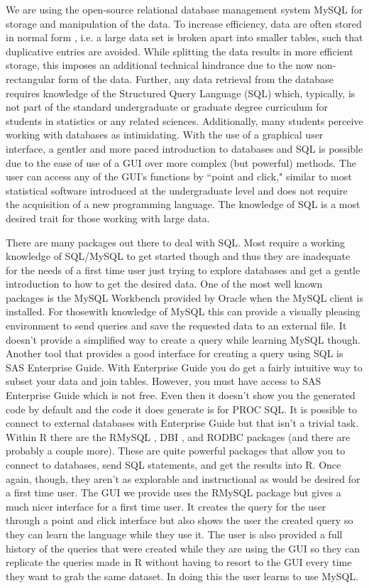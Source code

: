 \documentclass[11pt]{tise_style}
\begin{document}
We are using the open-source relational database management system MySQL \citep{mysql} for %
storage and manipulation of the data. To increase efficiency, data are often stored in normal form \citep{normalform:1983}, i.e. a large data set is broken apart into smaller  tables, such that duplicative entries are avoided. While splitting the data results in  more efficient storage, this imposes an additional technical hindrance due to the now non-rectangular form of the data. Further, any data retrieval from the database requires knowledge of the Structured Query Language (SQL) which, typically, is not part of the standard undergraduate or graduate degree curriculum for students in statistics or any related sciences. Additionally,  many students perceive working with databases as intimidating. With the use of a graphical user interface, a gentler and more paced introduction to databases and SQL is possible due to the ease of use of a GUI over more complex (but powerful) methods.  The user can access any of the GUI's functions by ``point and click," similar to most statistical software introduced at the undergraduate level and does not require the acquisition of a new programming language.  The knowledge of SQL is a most desired trait for those working with large data.

There are many packages out there to deal with SQL.  Most require a working knowledge of SQL/MySQL to get started though and thus they are inadequate for the needs of a first time user just trying to explore databases and get a gentle introduction to how to get the desired data.  One of the most well known packages is the MySQL Workbench provided by Oracle when the MySQL client is installed.  For thosewith knowledge of MySQL this can provide a visually pleasing environment to send queries and save the requested data to an external file.  It doesn't provide a simplified way to create a query while learning MySQL though.  Another tool that provides a good interface for creating a query using SQL is SAS Enterprise Guide.  With Enterprise Guide you do get a fairly intuitive way to subset your data and join tables.  However, you must have access to SAS Enterprise Guide which is not free.  Even then it doesn't show you the generated code by default and the code it does generate is for PROC SQL.  It is possible to connect to external databases with Enterprise Guide but that isn't a trivial task.  Within R there are the RMySQL \citep{rmysql}, DBI \citep{dbi}, and RODBC \citep{rodbc} packages (and there are probably a couple more).  These are quite powerful packages that allow you to connect to databases, send SQL statements, and get the results into R.  Once again, though, they aren't as explorable and instructional as would be desired for a first time user.  The GUI we provide uses the RMySQL package but gives a much nicer interface for a first time user.  It creates the query for the user through a point and click interface but also shows the user the created query so they can learn the language while they use it.  The user is also provided a full history of the queries that were created while they are using the GUI so they can replicate the queries made in R without having to resort to the GUI every time they want to grab the same dataset.  In doing this the user learns to use MySQL.
\end{document}

